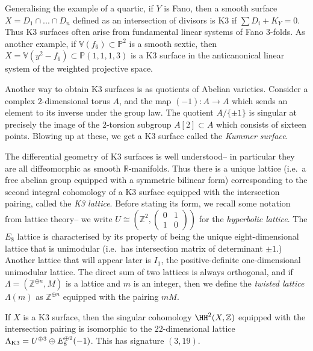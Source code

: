 Generalising the example of a quartic, if \(Y\) is Fano, then a smooth surface
\(X=D_1\cap ...  \cap D_n\) defined as an intersection of divisors is K3 if
\(\sum D_i+K_Y=0\). Thus K3 surfaces often arise from fundamental linear systems
of Fano 3-folds. As another example, if \(\mathbb{V}(f_6)\subset \mathbb{P}^2\)
is a smooth sextic, then \(X=\mathbb{V}(y^2-f_6)\subset \mathbb{P}(1,1,1,3)\) is
a K3 surface in the anticanonical linear system of the weighted projective
space.

\begin{example}
    Another way to obtain K3 surfaces is as quotients of Abelian
    varieties. Consider a complex \(2\)-dimensional torus \(A\), and the map
    \((-1):A\to A\) which sends an element to its inverse under the group law.
    The quotient \(A/\{\pm 1\}\) is singular at precisely the image of the
    \(2\)-torsion subgroup \(A[2]\subset A\) which consists of sixteen points.
    Blowing up at these, we get a K3 surface called the \textit{Kummer
    surface}.
\end{example}

The differential geometry of K3 surfaces is well understood-- in particular they
are all diffeomorphic as smooth \(\mathbb{R}\)-manifolds. Thus there is a unique
lattice (i.e.\ a free abelian group equipped with a symmetric bilinear form)
corresponding to the second integral cohomology of a K3 surface equipped with the
intersection pairing, called the \textit{K3 lattice}. Before stating its
form, we recall some notation from lattice theory-- we write \(U\cong (\mathbb{Z}^2, \left(\begin{smallmatrix} 0&1\\1&0
\end{smallmatrix}\right))\) for the \textit{hyperbolic lattice}. The \(E_8\)
lattice is characterised by its property of being the unique eight-dimensional
lattice that is unimodular (i.e.\ has intersection matrix of determinant \(\pm
1\).) Another lattice that will appear later is \(I_1\), the positive-definite
one-dimensional unimodular lattice. The direct sum of two lattices is always
orthogonal, and if \(\Lambda=(\mathbb{Z}^{\oplus n}, M)\) is a lattice and \(m\)
is an integer, then we define the \textit{twisted lattice} \(\Lambda(m)\) as
\(\mathbb{Z}^{\oplus n}\) equipped with the pairing \(mM\).

\begin{proposition}
    If \(X\) is a K3 surface, then the singular cohomology
    \(\HH^2(X,\mathbb{Z})\) equipped with the intersection pairing is isomorphic
    to the \(22\)-dimensional lattice \(\Lambda_{\textnormal{K3}}=U^{\oplus
    3}\oplus E_8^{\oplus 2}(-1)\). This has signature \((3,19)\).
\end{proposition}

